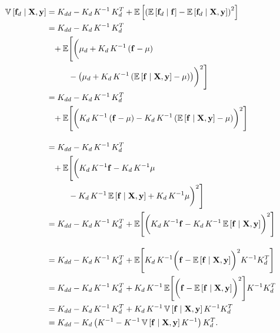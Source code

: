 \documentclass{draft}
\newcommand{\pd}{\ensuremath{\partial \,}}     %
\newcommand{\gradient}{\ensuremath{\mathbf{f}_d}} %
\begin{document}
\begin{align}
    \V \left[ \gradient \mid \mbf{X}, \mbf{y} \right]
    & =
    K_{dd} - K_d \, K^{-1} \, K_d^T
    + \E \left[ \left( \E \left[ \gradient \mid \mbf{f} \right] - \E \left[ \gradient \mid \mbf{X}, \mbf{y} \right] \right)^2 \right] \\
    & = 
    K_{dd} - K_d \, K^{-1} \, K_d^T
    \nonumber \\
    & \phantom{=}
    + \E
    \Biggl[
        \biggl(
            \mu_d + K_d \, K^{-1}
            \left( \mbf{f} - \mu \right)
    \nonumber \\
    & \phantom{= + \E}
            -
            \left(
                \mu_d + K_d \, K^{-1}
                \left( \E \left[ \mbf{f} \mid \mbf{X}, \mbf{y} \right] - \mu \right)
            \right)
        \biggr)^2
    \Biggr] \\
    & = 
    K_{dd} - K_d \, K^{-1} \, K_d^T
    \nonumber \\
    & \phantom{=}
    + \E
    \Biggl[
        \biggl(
            K_d \, K^{-1}
            \left( \mbf{f} - \mu \right)
            -
            K_d \, K^{-1}
            \left( \E \left[ \mbf{f} \mid \mbf{X}, \mbf{y} \right] - \mu \right)
        \biggr)^2
    \Biggr] \\[1em]
    & = 
    K_{dd} - K_d \, K^{-1} \, K_d^T
    \nonumber \\
    & \phantom{=}
    + \E
    \Biggl[
        \biggl(
            K_d \, K^{-1} \mbf{f}
            - K_d \, K^{-1} \mu
    \nonumber \\
    & \phantom{= + \E}
            -
            K_d \, K^{-1} \E \left[ \mbf{f} \mid \mbf{X}, \mbf{y} \right]
            + K_d \, K^{-1} \mu
        \biggr)^2
    \Biggr] \\
    & = 
    K_{dd} - K_d \, K^{-1} \, K_d^T
    + \E
    \Biggl[
        \biggl(
            K_d \, K^{-1} \mbf{f}
            -
            K_d \, K^{-1} \E \left[ \mbf{f} \mid \mbf{X}, \mbf{y} \right]
        \biggr)^2
    \Biggr] \\[1em]
    & = 
    K_{dd} - K_d \, K^{-1} \, K_d^T
    + \E
    \Biggl[
        K_d \, K^{-1} 
        \biggl(
            \mbf{f} - \E \left[ \mbf{f} \mid \mbf{X}, \mbf{y} \right]
        \biggr)^2
        K^{-1} K_d^T
    \Biggr] \\
    & = 
    K_{dd} - K_d \, K^{-1} \, K_d^T
    + 
    K_d \, K^{-1}
    \E \Biggl[
        \biggl(
            \mbf{f} - \E \left[ \mbf{f} \mid \mbf{X}, \mbf{y} \right]
        \biggr)^2
    \Biggr]
    K^{-1} K_d^T \\
    & = 
    K_{dd} - K_d \, K^{-1} \, K_d^T
    + 
    K_d \, K^{-1}
    \V \left[ \mbf{f} \mid \mbf{X}, \mbf{y} \right]
    K^{-1} K_d^T \\
    & = 
    K_{dd} - K_d \left( K^{-1} - K^{-1} \V \left[ \mbf{f} \mid \mbf{X}, \mbf{y} \right] K^{-1} \right) K_d^T.
\end{align}
\end{document}
